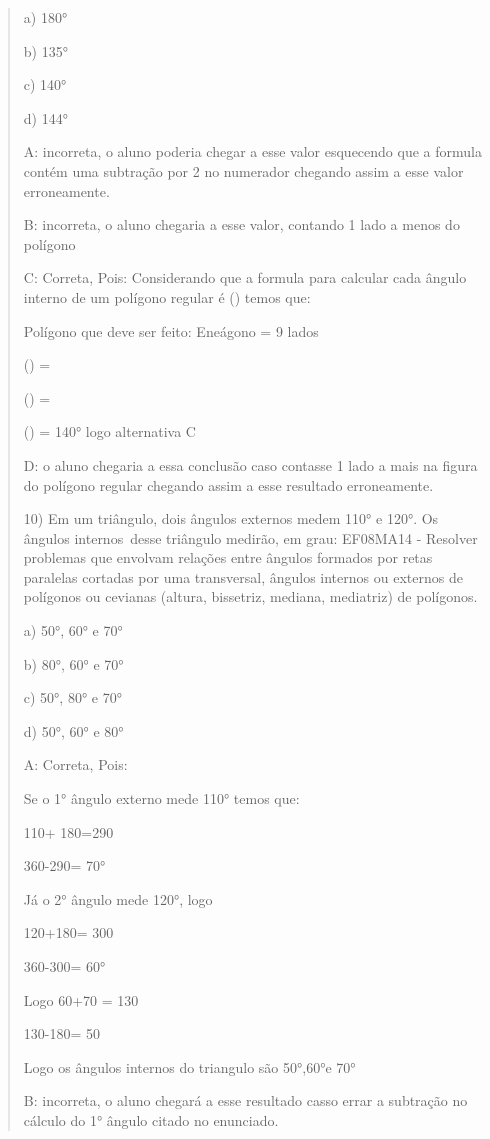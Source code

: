 \begin{quote}
\begin{escolha}
a) 180°

b) 135°

c) 140°

d) 144°

A: incorreta, o aluno poderia chegar a esse valor esquecendo que a
formula contém uma subtração por 2 no numerador chegando assim a esse
valor erroneamente.

B: incorreta, o aluno chegaria a esse valor, contando 1 lado a menos do
polígono

C: Correta, Pois: Considerando que a formula para calcular cada ângulo
interno de um polígono regular é
() temos que:

Polígono que deve ser feito: Eneágono = 9 lados

() =

() =

() = 140° logo alternativa C

D: o aluno chegaria a essa conclusão caso contasse 1 lado a mais na
figura do polígono regular chegando assim a esse resultado erroneamente.

10) Em um triângulo, dois ângulos externos medem 110° e 120°. Os ângulos
internos~desse triângulo medirão, em grau: EF08MA14 - Resolver problemas
que envolvam relações entre ângulos formados por retas paralelas
cortadas por uma transversal, ângulos internos ou externos de polígonos
ou cevianas (altura, bissetriz, mediana, mediatriz) de polígonos.

a) 50°, 60° e 70°

b) 80°, 60° e 70°

c) 50°, 80° e 70°

d) 50°, 60° e 80°

A: Correta, Pois:

Se o 1° ângulo externo mede 110° temos que:

110+ 180=290

360-290= 70°

Já o 2° ângulo mede 120°, logo

120+180= 300

360-300= 60°

Logo 60+70 = 130

130-180= 50

Logo os ângulos internos do triangulo são 50°,60°e 70°

B: incorreta, o aluno chegará a esse resultado casso errar a subtração
no cálculo do 1° ângulo citado no enunciado.


\end{escolha}
\end{quote}
